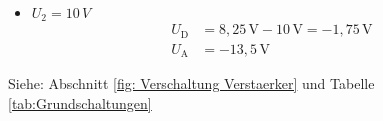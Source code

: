 {\begin{itemize}
        \item $U_2 = 10\,V$  
		\begin{align*}
            U_\mathrm{D} &= \mathrm{ 8,25\,V - 10\,V = -1,75\,V}\\
            U_\mathrm{A} &= \mathrm{-13,5\,V} 
		\end{align*}
    \end{itemize}
    Siehe: Abschnitt \ref{fig: Verschaltung Verstaerker} und Tabelle \ref{tab:Grundschaltungen}
        
}